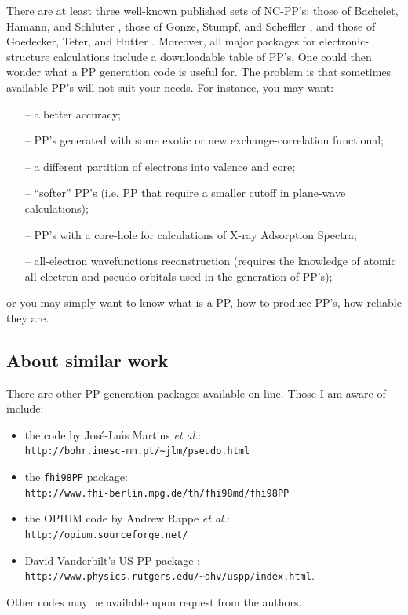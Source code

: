 \documentclass[12pt,a4paper]{article}
\begin{document}
There are at least three well-known published sets of NC-PP's:
those of Bachelet, Hamann, and Schl\"uter \cite{BHS},
those of Gonze, Stumpf, and Scheffler \cite{Gonze}, and
those of Goedecker, Teter, and Hutter \cite{Goedecker}. 
Moreover, all major packages for electronic-structure calculations
include a downloadable table of PP's. One could then wonder 
what a PP generation code is useful for. The problem is that 
sometimes available PP's will not suit your needs. For instance,
you may want:
\begin{enumerate}
 \item[--] a better accuracy;
 \item[--] PP's generated with some exotic or new exchange-correlation
     functional;
 \item[--] a different partition of electrons into valence and core;
 \item[--] ``softer'' PP's (i.e. PP that require a smaller cutoff
           in plane-wave calculations);
 \item[--] PP's with a core-hole for calculations of X-ray Adsorption
           Spectra;
 \item[--] all-electron wavefunctions reconstruction (requires the
           knowledge of atomic all-electron and pseudo-orbitals used in
           the generation of PP's);
\end{enumerate}
or you may simply want to know what is a PP, how to produce PP's, 
how reliable they are.

\subsection{About similar work}

There are other PP generation packages available on-line.
Those I am aware of include:
\begin{itemize}
\item the code by Jos\'e-Lu{\'\i}s Martins {\em et al.}\cite{TM}:\\
{\tt http://bohr.inesc-mn.pt/\~{}jlm/pseudo.html}
\item the {\tt fhi98PP} package\cite{fhi98PP}:\\
{\tt http://www.fhi-berlin.mpg.de/th/fhi98md/fhi98PP}
\item the OPIUM code by Andrew Rappe {\em et al.}\cite{RRKJ}:\\
{\tt http://opium.sourceforge.net/}
\item David Vanderbilt's US-PP package \cite{van}:\\
{\tt http://www.physics.rutgers.edu/\~{}dhv/uspp/index.html}.
\end{itemize}
Other codes may be available upon request from the authors.
\end{document}
